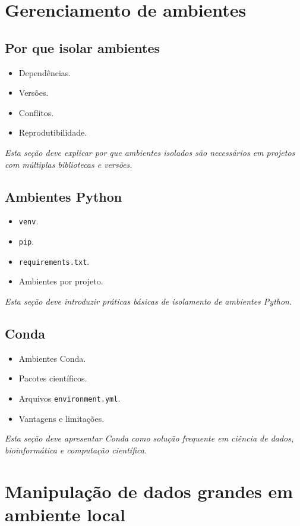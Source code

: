 \documentclass[12pt,openany]{book}
\newcommand{\placeholder}[1]{
    \par\medskip
    \noindent\textit{#1}
    \par\medskip
}
\newcommand{\topicos}[1]{
    \begin{itemize}
        #1
    \end{itemize}
}
\begin{document}
\begin{refsection}
\chapter{Gerenciamento de ambientes}

\section{Por que isolar ambientes}

\topicos{
    \item Dependências.
    \item Versões.
    \item Conflitos.
    \item Reprodutibilidade.
}

\placeholder{Esta seção deve explicar por que ambientes isolados são necessários em projetos com múltiplas bibliotecas e versões.}

\section{Ambientes Python}

\topicos{
    \item \texttt{venv}.
    \item \texttt{pip}.
    \item \texttt{requirements.txt}.
    \item Ambientes por projeto.
}

\placeholder{Esta seção deve introduzir práticas básicas de isolamento de ambientes Python.}

\section{Conda}

\topicos{
    \item Ambientes Conda.
    \item Pacotes científicos.
    \item Arquivos \texttt{environment.yml}.
    \item Vantagens e limitações.
}

\placeholder{Esta seção deve apresentar Conda como solução frequente em ciência de dados, bioinformática e computação científica.}

\chapter{Manipulação de dados grandes em ambiente local}


\end{refsection}
\end{document}
